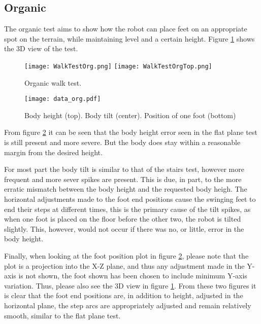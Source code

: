     \subsection{Organic}
    The organic test aims to show how the robot can place feet on an appropriate spot on the terrain, while maintaining level and a certain height. Figure \ref{fig:org_test} shows the
    3D view of the test.
    \begin{figure}[h]
        \centering
        \texttt{[image: WalkTestOrg.png]}
        \texttt{[image: WalkTestOrgTop.png]}
        \caption{Organic walk test.}
        \label{fig:org_test}
    \end{figure}
    \begin{figure}[h]
        \centering
        \texttt{[image: data\_org.pdf]}
        \caption{Body height (top). Body tilt (center). Position of one foot (bottom)}
        \label{fig:org_test_data}
    \end{figure}

    From figure \ref{fig:org_test_data} it can be seen that the body height error seen in the flat plane test
    is still present and more severe. But the body does stay within a reasonable margin from the desired height.

    For most part the body tilt is similar to that of the stairs test, however more frequent and more sever spikes are present.
    This is due, in part, to the more erratic mismatch between the body height and the requested body heigh. The horizontal adjustments made to 
    the foot end positions cause the swinging feet to end their steps at different times, this is the primary cause of the tilt spikes, as when one
    foot is placed on the floor before the other two, the robot is tilted slightly. This, however, would not occur if there was no, or little, 
    error in the body height.

    Finally, when looking at the foot position plot in figure \ref{fig:org_test_data}, please note that the plot is a projection into the X-Z plane, and thus any
    adjustment made in the Y-axis is not shown, the foot shown has been chosen to include minimum Y-axis variation. 
    Thus, please also see the 3D view in figure \ref{fig:org_test}. From these two figures it is clear that the foot end positions are, in addition to height,
    adjusted in the horizontal plane, the step arcs are appropriately adjusted and remain relatively smooth, similar to the flat plane test.



